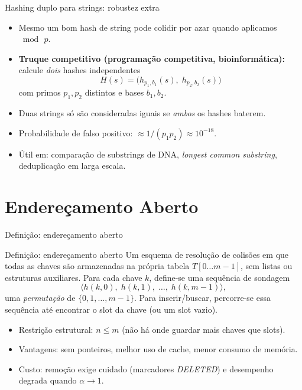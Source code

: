 \documentclass[aspectratio=169]{beamer}
\begin{document}
\begin{frame}{Hashing duplo para strings: robustez extra}
\begin{itemize}
\item Mesmo um bom hash de string pode colidir por azar quando aplicamos $\bmod\,p$.
\item \textbf{Truque competitivo (programação competitiva, bioinformática):} calcule \emph{dois} hashes independentes
$$H(s) = \big(h_{p_1, b_1}(s),\; h_{p_2, b_2}(s)\big)$$
com primos $p_1, p_2$ distintos e bases $b_1, b_2$.
\item Duas strings só são consideradas iguais se \emph{ambos} os hashes baterem.
\item Probabilidade de falso positivo: $\approx 1/(p_1 p_2) \approx 10^{-18}$.
\item Útil em: comparação de substrings de DNA, \emph{longest common substring}, deduplicação em larga escala.
\end{itemize}
\end{frame}

\section{Endereçamento Aberto}

\begin{frame}{Definição: endereçamento aberto}
\begin{block}{Definição: endereçamento aberto}
Um esquema de resolução de colisões em que \alert{todas as chaves são armazenadas na própria tabela $T[0\dots m-1]$}, sem listas ou estruturas auxiliares. Para cada chave $k$, define-se uma \alert{sequência de sondagem}
$$\langle h(k,0),\; h(k,1),\; \dots,\; h(k,m-1) \rangle,$$
uma \emph{permutação} de $\{0,1,\dots,m-1\}$. Para inserir/buscar, percorre-se essa sequência até encontrar o slot da chave (ou um slot vazio).
\end{block}
\begin{itemize}
\item Restrição estrutural: $n \le m$ (não há onde guardar mais chaves que slots).
\item Vantagens: sem ponteiros, melhor uso de cache, menor consumo de memória.
\item Custo: remoção exige cuidado (marcadores \emph{DELETED}) e desempenho degrada quando $\alpha \to 1$.
\end{itemize}
\end{frame}
\end{document}
